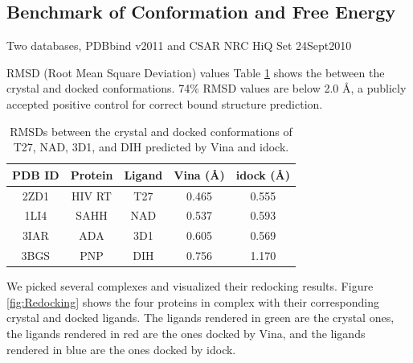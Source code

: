 \documentclass[10pt,conference,compsocconf]{../IEEEtran}
\begin{document}
\subsection{Benchmark of Conformation and Free Energy}

Two databases, PDBbind v2011 and CSAR NRC HiQ Set 24Sept2010

RMSD (Root Mean Square Deviation) values
Table \ref{tab:RMSD} shows the  between the crystal and docked conformations. 74\% RMSD values are below 2.0 \AA, a publicly accepted positive control for correct bound structure prediction.

\begin{table}
\centering
\begin{tabular*}
{\linewidth}
{@{\extracolsep{\fill}}ccccc}
\toprule
PDB ID & Protein & Ligand & Vina (\AA) & idock (\AA)\\
\midrule
2ZD1 & HIV RT & T27 & 0.465 & 0.555\\
1LI4 & SAHH   & NAD & 0.537 & 0.593\\
3IAR & ADA    & 3D1 & 0.605 & 0.569\\
3BGS & PNP    & DIH & 0.756 & 1.170\\
\bottomrule
\end{tabular*}
\caption{RMSDs between the crystal and docked conformations of T27, NAD, 3D1, and DIH predicted by Vina and idock.}
\label{tab:RMSD}
\end{table}

We picked several complexes and visualized their redocking results. Figure \ref{fig:Redocking} shows the four proteins in complex with their corresponding crystal and docked ligands. The ligands rendered in green are the crystal ones, the ligands rendered in red are the ones docked by Vina, and the ligands rendered in blue are the ones docked by idock.
\end{document}
